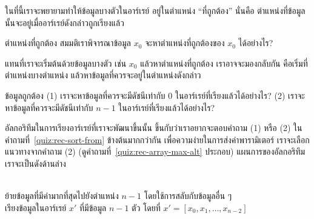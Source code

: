 ใน{\wbr}ที่นี้{\wbr}เรา{\wbr}จะ{\wbr}พยายาม{\wbr}ทำ{\wbr}ให้{\wbr}ข้อมูล{\wbr}บาง{\wbr}ตัว{\wbr}ใน{\wbr}อาร์เรย์ อยู่{\wbr}ใน{\wbr}ตำแหน่ง ``ที่{\wbr}ถูกต้อง'' นั่น{\wbr}คือ{\wbr}
ตำแหน่ง{\wbr}ที่{\wbr}ข้อมูล{\wbr}นั้น{\wbr}จะ{\wbr}อยู่{\wbr}เมื่อ{\wbr}อาร์เรย์{\wbr}ดังกล่าว{\wbr}ถูก{\wbr}เรียง{\wbr}แล้ว  

\begin{quiz}{ตำแหน่ง{\wbr}ที่{\wbr}ถูกต้อง}
สมมติ{\wbr}เรา{\wbr}พิจารณา{\wbr}ข้อมูล $x_0$ จะ{\wbr}หา{\wbr}ตำแหน่ง{\wbr}ที่{\wbr}ถูกต้อง{\wbr}ของ $x_0$ ได้{\wbr}อย่างไร?
\end{quiz}

แทน{\wbr}ที่{\wbr}เรา{\wbr}จะ{\wbr}เริ่มต้น{\wbr}ด้วย{\wbr}ข้อมูล{\wbr}บาง{\wbr}ตัว เช่น $x_0$ แล้ว{\wbr}หา{\wbr}ตำแหน่ง{\wbr}ที่{\wbr}ถูกต้อง{\wbr}
เรา{\wbr}อาจ{\wbr}จะ{\wbr}มอง{\wbr}กลับ{\wbr}กัน คือ{\wbr}เริ่ม{\wbr}ที่{\wbr}ตำแหน่ง{\wbr}บาง{\wbr}ตำแหน่ง แล้ว{\wbr}หา{\wbr}ข้อมูล{\wbr}ที่{\wbr}ควร{\wbr}จะ{\wbr}อยู่{\wbr}ใน{\wbr}ตำแหน่ง{\wbr}ดังกล่าว{\wbr}

\begin{quiz}{ข้อมูล{\wbr}ถูกต้อง}
\label{quiz:rec-sort-from}
(1) เรา{\wbr}จะ{\wbr}หา{\wbr}ข้อมูล{\wbr}ที่{\wbr}ควร{\wbr}จะ{\wbr}มี{\wbr}ดัชนี{\wbr}เท่า{\wbr}กับ $0$ ใน{\wbr}อาร์เรย์{\wbr}ที่{\wbr}เรียง{\wbr}แล้ว{\wbr}ได้{\wbr}อย่างไร?  (2)
เรา{\wbr}จะ{\wbr}หา{\wbr}ข้อมูล{\wbr}ที่{\wbr}ควร{\wbr}จะ{\wbr}มี{\wbr}ดัชนี{\wbr}เท่า{\wbr}กับ $n-1$ ใน{\wbr}อาร์เรย์{\wbr}ที่{\wbr}เรียง{\wbr}แล้ว{\wbr}ได้{\wbr}อย่างไร?
\end{quiz}

อัล{\wbr}กอ{\wbr}ริ{\wbr}ทึม{\wbr}ใน{\wbr}การ{\wbr}เรียง{\wbr}อาร์เรย์{\wbr}ที่{\wbr}เรา{\wbr}จะ{\wbr}พัฒนา{\wbr}ขึ้น{\wbr}นั้น ขึ้น{\wbr}กับ{\wbr}ว่า{\wbr}เรา{\wbr}อยาก{\wbr}จะ{\wbr}ตอบ{\wbr}คำถาม (1) หรือ{\wbr}
(2) ใน{\wbr}คำถาม{\wbr}ที่~\ref{quiz:rec-sort-from} ข้างต้น{\wbr}มาก{\wbr}กว่า{\wbr}กัน{\wbr}
เพื่อ{\wbr}ความ{\wbr}ง่าย{\wbr}ใน{\wbr}การ{\wbr}ส่ง{\wbr}ค่า{\wbr}พารามิเตอร์ เรา{\wbr}จะ{\wbr}เลือก{\wbr}แนวทาง{\wbr}จาก{\wbr}คำถาม (2)
(ดู{\wbr}คำถาม{\wbr}ที่~\ref{quiz:rec-array-max-alt} ประกอบ)
แผนการ{\wbr}ของ{\wbr}อัล{\wbr}กอ{\wbr}ริ{\wbr}ทึม{\wbr}เรา{\wbr}จะ{\wbr}เป็น{\wbr}ดัง{\wbr}ด้าน{\wbr}ล่าง{\wbr}

\begin{algt}
\label{algo:rec-sorting}
\\
\hspace*{0.2in} ย้าย{\wbr}ข้อมูล{\wbr}ที่{\wbr}มี{\wbr}ค่า{\wbr}มาก{\wbr}ที่สุด{\wbr}ไป{\wbr}ยัง{\wbr}ตำแหน่ง $n-1$ โดย{\wbr}ใช้{\wbr}การ{\wbr}สลับ{\wbr}กับ{\wbr}ข้อมูล{\wbr}อื่น ๆ\\
\hspace*{0.2in} เรียง{\wbr}ข้อมูล{\wbr}ใน{\wbr}อาร์เรย์ $x'$ ที่{\wbr}มี{\wbr}ข้อมูล $n-1$ ตัว โดย{\wbr}ที่ $x'=[x_0,x_1,\ldots,x_{n-2}]$
\end{algt}

